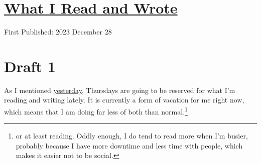 \documentclass[12pt]{article}[titlepage]
\newcommand{\1}{\={a}}
\newcommand{\2}{\={e}}
\newcommand{\3}{\={\i}}
\newcommand{\4}{\=o}
\newcommand{\5}{\=u}
\newcommand{\6}{\={A}}
\renewcommand{\,}{\textsuperscript{,}}
\begin{document}
\doublespacing
\section{\href{reading-writing-23-12-28.html}{What I Read and Wrote}}
First Published: 2023 December 28

\section{Draft 1}
As I mentioned \href{schedules-3.html}{yesterday}, Thursdays are going to be reserved for what I'm reading and writing lately.
It is currently a form of vacation for me right now, which means that I am doing far less of both than normal.\footnote{or at least reading. Oddly enough, I do tend to read more when I'm busier, probably because I have more downtime and less time with people, which makes it easier not to be social.}
\end{document}
